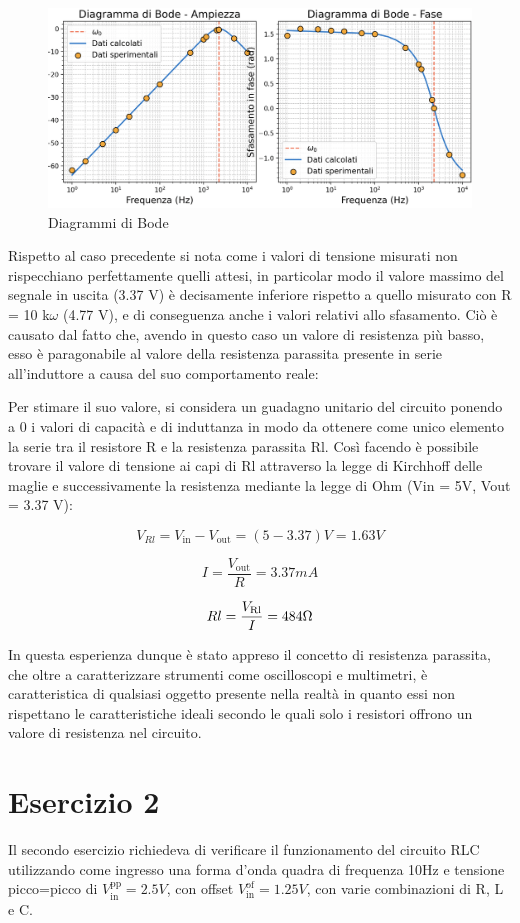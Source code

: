 \begin{figure}[H]
    \centering
    \includegraphics[width=0.6\linewidth]{bode2.png}
    \caption{Diagrammi di Bode}
    \label{fig:enter-label}
\end{figure}

Rispetto al caso precedente si nota come i valori di tensione misurati non rispecchiano perfettamente quelli
attesi, in particolar modo il valore massimo del segnale in uscita (3.37 V) è decisamente inferiore rispetto a
quello misurato con R = 10 k$\omega$ (4.77 V), e di conseguenza anche i valori relativi allo sfasamento. Ciò è causato
dal fatto che, avendo in questo caso un valore di resistenza più basso, esso è paragonabile al valore della
resistenza parassita presente in serie all’induttore a causa del suo comportamento reale:


Per stimare il suo valore, si considera un guadagno unitario del circuito ponendo a 0 i valori di capacità e di induttanza in modo da ottenere come unico elemento la serie tra il resistore R e la resistenza parassita Rl. Così facendo è possibile trovare il valore di tensione ai capi di Rl attraverso la legge di Kirchhoff delle maglie e successivamente la resistenza mediante la legge di Ohm (Vin = 5V, Vout = 3.37 V):

$$V_{Rl} = V_\text{in}-V_\text{out}=(5-3.37)V=1.63V$$

$$I=\frac{V_\text{out}}{R}=3.37mA$$

$$Rl = \frac{V_\text{Rl}}{I}=484\ohm$$

In questa esperienza dunque è stato appreso il concetto di resistenza parassita, che oltre a caratterizzare strumenti come oscilloscopi e multimetri, è caratteristica di qualsiasi oggetto presente nella realtà in quanto essi non rispettano le caratteristiche ideali secondo le quali solo i resistori offrono un valore di resistenza nel circuito.

\section{Esercizio 2}
Il secondo esercizio richiedeva di verificare il funzionamento del circuito RLC utilizzando come ingresso una forma d'onda quadra di frequenza 10Hz e tensione picco=picco di $V_\text{in}^\text{pp}=2.5V$, con offset $V_\text{in}^\text{of}=1.25V$, con varie combinazioni di R, L e C.


